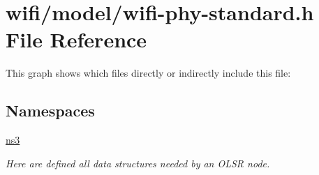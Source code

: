 \hypertarget{wifi-phy-standard_8h}{}\section{wifi/model/wifi-\/phy-\/standard.h File Reference}
\label{wifi-phy-standard_8h}
This graph shows which files directly or indirectly include this file\+:
\subsection*{Namespaces}
\begin{DoxyCompactItemize}
\item 
 \hyperlink{namespacens3}{ns3}
\begin{DoxyCompactList}\small\item\em Here are defined all data structures needed by an O\+L\+SR node. \end{DoxyCompactList}\end{DoxyCompactItemize}
